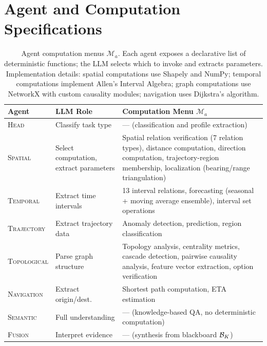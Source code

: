 \FloatBarrier
\section{Agent and Computation Specifications}
\label{app:agents}

\begin{table}[!htbp]
\centering
\caption{Agent computation menus $\mathcal{M}_a$.  Each agent exposes a declarative list of deterministic functions; the LLM selects which to invoke and extracts parameters.  Implementation details: spatial computations use Shapely and NumPy; temporal computations implement Allen's Interval Algebra; graph computations use NetworkX with custom causality modules; navigation uses Dijkstra's algorithm.}
\label{tab:tools}
\small
\begin{tabular}{lp{2.2cm}p{5.8cm}}
\toprule
Agent & LLM Role & Computation Menu $\mathcal{M}_a$ \\
\midrule
\textsc{Head} & Classify task type & --- (classification and profile extraction) \\
\textsc{Spatial} & Select computation, extract parameters & Spatial relation verification (7 relation types), distance computation, direction computation, trajectory-region membership, localization (bearing/range triangulation) \\
\textsc{Temporal} & Extract time intervals & 13 interval relations, forecasting (seasonal + moving average ensemble), interval set operations \\
\textsc{Trajectory} & Extract trajectory data & Anomaly detection, prediction, region classification \\
\textsc{Topological} & Parse graph structure & Topology analysis, centrality metrics, cascade detection, pairwise causality analysis, feature vector extraction, option verification \\
\textsc{Navigation} & Extract origin/dest. & Shortest path computation, ETA estimation \\
\textsc{Semantic} & Full understanding & --- (knowledge-based QA, no deterministic computation) \\
\textsc{Fusion} & Interpret evidence & --- (synthesis from blackboard $\mathcal{B}_K$) \\
\bottomrule
\end{tabular}
\end{table}


\FloatBarrier
